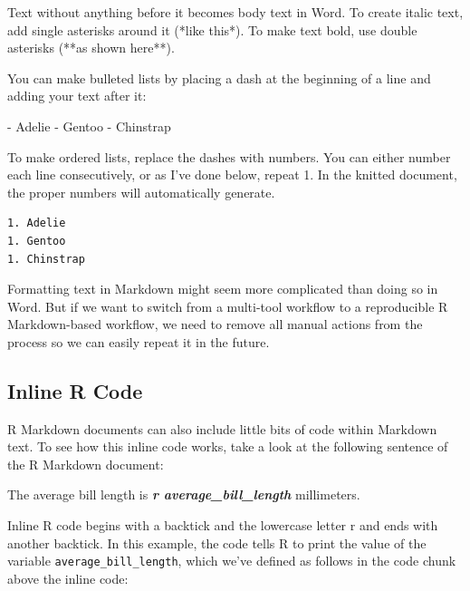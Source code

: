 \documentclass[
]{book}
\newenvironment{Shaded}{\begin{snugshade}}{\end{snugshade}}
\newcommand{\InformationTok}[1]{\textcolor[rgb]{0.56,0.35,0.01}{\textbf{\textit{#1}}}}
\newcommand{\NormalTok}[1]{#1}
\newcommand{\SpecialStringTok}[1]{\textcolor[rgb]{0.31,0.60,0.02}{#1}}
\begin{document}
Text without anything before it becomes body text in Word. To create italic text, add single asterisks around it (*like this*). To make text bold, use double asterisks (**as shown here**).

You can make bulleted lists by placing a dash at the beginning of a line and adding your text after it:

\begin{Shaded}
\begin{Highlighting}[]
\SpecialStringTok{{-} }\NormalTok{Adelie}
\SpecialStringTok{{-} }\NormalTok{Gentoo}
\SpecialStringTok{{-} }\NormalTok{Chinstrap}
\end{Highlighting}
\end{Shaded}

To make ordered lists, replace the dashes with numbers. You can either number each line consecutively, or as I've done below, repeat 1. In the knitted document, the proper numbers will automatically generate.

\begin{verbatim}
1. Adelie
1. Gentoo
1. Chinstrap
\end{verbatim}

Formatting text in Markdown might seem more complicated than doing so in Word. But if we want to switch from a multi-tool workflow to a reproducible R Markdown-based workflow, we need to remove all manual actions from the process so we can easily repeat it in the future.

\hypertarget{inline-r-code}{%
\subsection*{Inline R Code}\label{inline-r-code}}

R Markdown documents can also include little bits of code within Markdown text. To see how this inline code works, take a look at the following sentence of the R Markdown document:

\begin{Shaded}
\begin{Highlighting}[]
\NormalTok{The average bill length is }\InformationTok{\textasciigrave{}r average\_bill\_length\textasciigrave{}}\NormalTok{ millimeters.}
\end{Highlighting}
\end{Shaded}

Inline R code begins with a backtick and the lowercase letter r and ends with another backtick. In this example, the code tells R to print the value of the variable \texttt{average\_bill\_length}, which we've defined as follows in the code chunk above the inline code:
\end{document}

